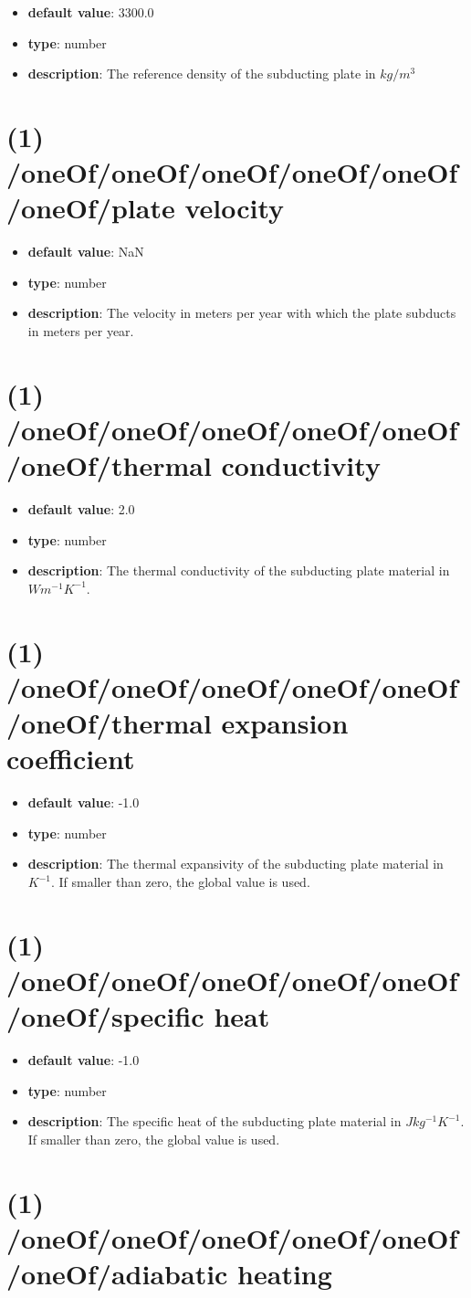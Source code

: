 \begin{itemize}[leftmargin=1em]\item {\bf default value}: 3300.0
\item {\bf type}: number
\item {\bf description}: The reference density of the subducting plate in $kg/m^3$
\end{itemize}\section{(1) /oneOf/oneOf/oneOf/oneOf/oneOf/oneOf/plate velocity}
\begin{itemize}[leftmargin=1em]\item {\bf default value}: NaN
\item {\bf type}: number
\item {\bf description}: The velocity in meters per year with which the plate subducts in meters per year.
\end{itemize}\section{(1) /oneOf/oneOf/oneOf/oneOf/oneOf/oneOf/thermal conductivity}
\begin{itemize}[leftmargin=1em]\item {\bf default value}: 2.0
\item {\bf type}: number
\item {\bf description}: The thermal conductivity of the subducting plate material in $W m^{-1} K^{-1}$.
\end{itemize}\section{(1) /oneOf/oneOf/oneOf/oneOf/oneOf/oneOf/thermal expansion coefficient}
\begin{itemize}[leftmargin=1em]\item {\bf default value}: -1.0
\item {\bf type}: number
\item {\bf description}: The thermal expansivity of the subducting plate material in $K^{-1}$. If smaller than zero, the global value is used.
\end{itemize}\section{(1) /oneOf/oneOf/oneOf/oneOf/oneOf/oneOf/specific heat}
\begin{itemize}[leftmargin=1em]\item {\bf default value}: -1.0
\item {\bf type}: number
\item {\bf description}: The specific heat of the subducting plate material in $J kg^{-1} K^{-1}$. If smaller than zero, the global value is used.
\end{itemize}\section{(1) /oneOf/oneOf/oneOf/oneOf/oneOf/oneOf/adiabatic heating}
